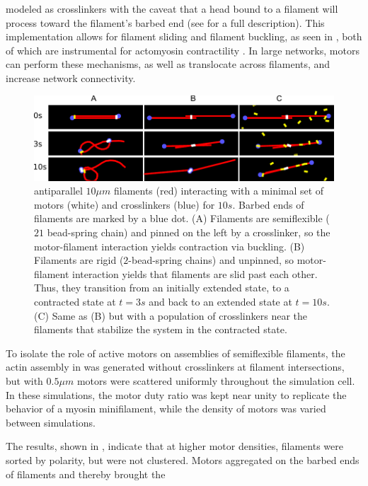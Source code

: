 \documentclass[12pt]{article} \usepackage{times} \usepackage{graphicx}
\begin{document}
modeled as crosslinkers with the caveat that a head bound to a filament will
process toward the filament's barbed end (see  for a
full description).  This implementation allows for filament sliding and
filament buckling, as seen in , both of which are instrumental
for actomyosin contractility \cite{murrell2012}.  In large networks, motors can
perform these mechanisms, as well as translocate across filaments, and increase
network connectivity\cite{murrell2014}.  \begin{figure}[H] \centering
  \includegraphics[width=\textwidth]{figs/minimal.pdf}
  \caption{\label{fig:slide} \label{fig:toys}%
  antiparallel $10\mu m$ filaments (red) interacting with a minimal set of
  motors (white) and crosslinkers (blue) for $10s$. Barbed ends of filaments
  are marked by a blue dot.  (A) Filaments are semiflexible ($21$ bead-spring
  chain) and pinned on the left by a crosslinker, so the motor-filament
  interaction yields contraction via buckling.  (B) Filaments are rigid
  ($2$-bead-spring chains) and unpinned, so motor-filament interaction yields
  that filaments are slid past each other. Thus, they transition from an
  initially extended state, to a contracted state at $t=3s$ and back to an
  extended state at $t=10s$.  (C) Same as (B) but with a population of
crosslinkers near the filaments that stabilize the system in the contracted
state. } \end{figure} To isolate the role of active motors on assemblies of
semiflexible filaments, the actin assembly in  was generated
without  crosslinkers at filament intersections, but with $0.5\mu m$ motors
were scattered uniformly throughout the simulation cell.  In these simulations,
the motor duty ratio was kept near unity to replicate the behavior of a myosin
minifilament, while the density of motors was varied between simulations.  \par
The results, shown in , indicate that at higher
motor densities, filaments were sorted by polarity, but were not clustered.
Motors aggregated on the barbed ends of filaments and thereby brought the
\end{document}
